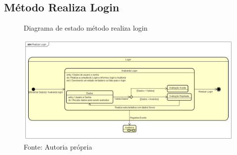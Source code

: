 \documentclass{utfpr-pg}
\begin{document}
\subsection{Método Realiza Login}
        \begin{figure}[H]
            \centering
            \captionsetup{width=\textwidth}
            \caption{Diagrama de estado método realiza login}
            \includegraphics[width=\linewidth]{fotos/est1.png}
            \caption*{Fonte: Autoria própria}
            \label{fig:Diagrama de Classes}
        \end{figure}

\end{document}
